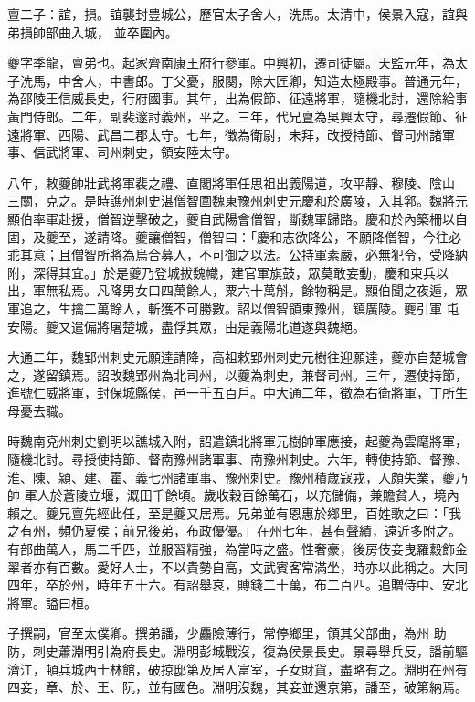\begin{pinyinscope}
 亶二子：誼，損。誼襲封豊城公，歷官太子舍人，洗馬。太清中，侯景入寇，誼與弟損帥部曲入城，
 並卒圍內。



 夔字季龍，亶弟也。起家齊南康王府行參軍。中興初，遷司徒屬。天監元年，為太子洗馬，中舍人，中書郎。丁父憂，服闋，除大匠卿，知造太極殿事。普通元年，為邵陵王信威長史，行府國事。其年，出為假節、征遠將軍，隨機北討，還除給事黃門侍郎。二年，副裴邃討義州，平之。三年，代兄亶為吳興太守，尋遷假節、征遠將軍、西陽、武昌二郡太守。七年，徵為衛尉，未拜，改授持節、督司州諸軍事、信武將軍、司州刺史，領安陸太守。



 八年，敕夔帥壯武將軍裴之禮、直閣將軍任思祖出義陽道，攻平靜、穆陵、陰山
 三關，克之。是時譙州刺史湛僧智圍魏東豫州刺史元慶和於廣陵，入其郛。魏將元顯伯率軍赴援，僧智逆擊破之，夔自武陽會僧智，斷魏軍歸路。慶和於內築柵以自固，及夔至，遂請降。夔讓僧智，僧智曰：「慶和志欲降公，不願降僧智，今往必乖其意；且僧智所將為烏合募人，不可御之以法。公持軍素嚴，必無犯令，受降納附，深得其宜。」於是夔乃登城拔魏幟，建官軍旗鼓，眾莫敢妄動，慶和束兵以出，軍無私焉。凡降男女口四萬餘人，粟六十萬斛，餘物稱是。顯伯聞之夜遁，眾軍追之，生擒二萬餘人，斬獲不可勝數。詔以僧智領東豫州，鎮廣陵。夔引軍
 屯安陽。夔又遣偏將屠楚城，盡俘其眾，由是義陽北道遂與魏絕。



 大通二年，魏郢州刺史元願達請降，高祖敕郢州刺史元樹往迎願達，夔亦自楚城會之，遂留鎮焉。詔改魏郢州為北司州，以夔為刺史，兼督司州。三年，遷使持節，進號仁威將軍，封保城縣侯，邑一千五百戶。中大通二年，徵為右衛將軍，丁所生母憂去職。



 時魏南兗州刺史劉明以譙城入附，詔遣鎮北將軍元樹帥軍應接，起夔為雲麾將軍，隨機北討。尋授使持節、督南豫州諸軍事、南豫州刺史。六年，轉使持節、督豫、淮、陳、潁、建、霍、義七州諸軍事、豫州刺史。豫州積歲寇戎，人頗失業，夔乃帥
 軍人於蒼陵立堰，溉田千餘頃。歲收穀百餘萬石，以充儲備，兼贍貧人，境內賴之。夔兄亶先經此任，至是夔又居焉。兄弟並有恩惠於鄉里，百姓歌之曰：「我之有州，頻仍夏侯；前兄後弟，布政優優。」在州七年，甚有聲績，遠近多附之。有部曲萬人，馬二千匹，並服習精強，為當時之盛。性奢豪，後房伎妾曳羅縠飾金翠者亦有百數。愛好人士，不以貴勢自高，文武賓客常滿坐，時亦以此稱之。大同四年，卒於州，時年五十六。有詔舉哀，賻錢二十萬，布二百匹。追贈侍中、安北將軍。謚曰桓。



 子撰嗣，官至太僕卿。撰弟譒，少麤險薄行，常停鄉里，領其父部曲，為州
 助防，刺史蕭淵明引為府長史。淵明彭城戰沒，復為侯景長史。景尋舉兵反，譒前驅濟江，頓兵城西士林館，破掠邸第及居人富室，子女財貨，盡略有之。淵明在州有四妾，章、於、王、阮，並有國色。淵明沒魏，其妾並還京第，譒至，破第納焉。




\end{pinyinscope}
